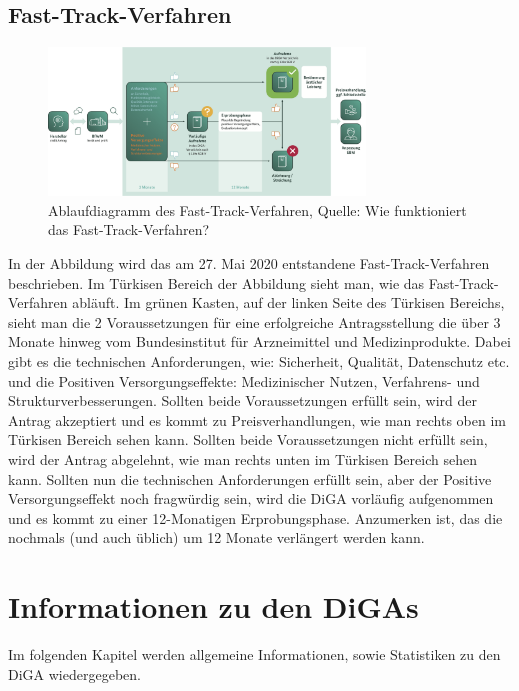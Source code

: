 \documentclass{article}
\begin{document}
		\subsection{Fast-Track-Verfahren} 
			\begin{figure}[htbp]
				\centering
				\includegraphics[width=0.75\textwidth]{./grafiken/fast-track-verfahren}
				\caption[Ablaufdiagramm des Fast-Track-Verfahren]{Ablaufdiagramm des Fast-Track-Verfahren, Quelle: Wie funktioniert das Fast-Track-Verfahren? \cite{BfArM-Fast-TrackVerfahren}}
				\label{Abb-ft-Verfahren}
			\end{figure}
			In der Abbildung wird das am 27. Mai 2020 entstandene Fast-Track-Verfahren beschrieben. Im Türkisen Bereich der Abbildung sieht man, wie das Fast-Track-Verfahren abläuft. Im grünen Kasten, auf der linken Seite des Türkisen Bereichs, sieht man die 2 Voraussetzungen für eine erfolgreiche Antragsstellung die über 3 Monate hinweg vom Bundesinstitut für Arzneimittel und Medizinprodukte. Dabei gibt es die technischen Anforderungen, wie: Sicherheit, Qualität, Datenschutz etc. und die Positiven Versorgungseffekte: Medizinischer Nutzen, Verfahrens- und Strukturverbesserungen. Sollten beide Voraussetzungen erfüllt sein, wird der Antrag akzeptiert und es kommt zu Preisverhandlungen, wie man rechts oben im Türkisen Bereich sehen kann. Sollten beide Voraussetzungen nicht erfüllt sein, wird der Antrag abgelehnt, wie man rechts unten im Türkisen Bereich sehen kann. Sollten nun die technischen Anforderungen erfüllt sein, aber der Positive Versorgungseffekt noch fragwürdig sein, wird die DiGA vorläufig aufgenommen und es kommt zu einer 12-Monatigen Erprobungsphase. Anzumerken ist, das die nochmals (und auch üblich) um 12 Monate verlängert werden kann.
		\newpage
	\section{Informationen zu den DiGAs}   
		Im folgenden Kapitel werden allgemeine Informationen, sowie Statistiken zu den DiGA wiedergegeben.
\end{document}
